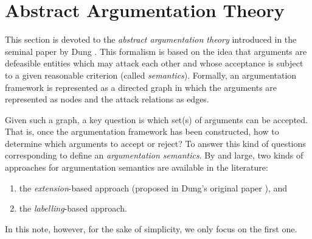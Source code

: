 \section{Abstract Argumentation Theory}
\label{sec: AAT}



This section is devoted to the \textit{abstract argumentation theory} introduced in the seminal paper by  Dung \cite{Dun1995}.
% 
This formalism is based on the idea that arguments are defeasible entities which may attack each other and whose acceptance is subject to a given reasonable criterion (called \textit{semantics}).
% 
Formally, 
an argumentation framework is represented as a directed graph in which the arguments are represented as nodes and the attack relations as  edges.
% 


Given such a graph, 
a key question is which set(s) of arguments can be accepted.
That is, 
once the argumentation framework has been constructed, 
how to determine which arguments to accept or reject?
% 
To answer this kind of questions corresponding to define an \textit{argumentation semantics}.
%
% 
By and large, 
two kinds of approaches for argumentation semantics are available in the literature: 
\begin{enumerate}[itemsep=5pt,parsep=0pt,leftmargin=3em,topsep=5pt,label=(\arabic*)]
    \item the \textit{extension}-based approach (proposed in Dung's original paper \cite{Dun1995}), and
    \item the \textit{labelling}-based approach.
\end{enumerate}
% 
In this note, 
however, 
for the sake of simplicity,
we only focus on the first one.










